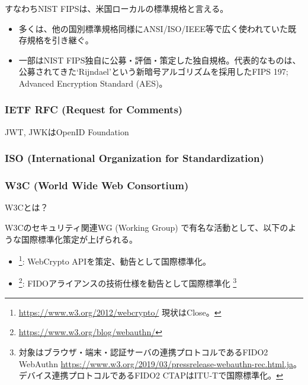 \documentclass[12pt,dvipdfmx]{beamer}
\begin{document}
\begin{frame}
すなわちNIST FIPSは、米国ローカルの標準規格と言える。

\begin{itemize}
\item 多くは、他の国別標準規格同様にANSI/ISO/IEEE等で広く使われていた既存規格を引き継ぐ。
\item 一部はNIST FIPS独自に公募・評価・策定した独自規格。代表的なものは、公募されてきた`Rijndael'という新暗号アルゴリズムを採用したFIPS 197; Advanced Encryption Standard (AES)。
\end{itemize}
\end{frame}

\begin{frame}
\frametitle{IETF RFC (Request for Comments)}
JWT, JWKはOpenID Foundation
\end{frame}

\begin{frame}
\frametitle{ISO (International Organization for Standardization)}
\end{frame}

\begin{frame}
\frametitle{W3C (World Wide Web Consortium)}
\begin{block}{W3Cとは？}
\end{block}

\end{frame}

\begin{frame}
W3Cのセキュリティ関連WG (Working Group) で有名な活動として、以下のような国際標準化策定が上げられる。
\begin{itemize}
 \item {}\footnote[frame]{\scriptsize \url{https://www.w3.org/2012/webcrypto/} 現状はClose。}: WebCrypto APIを策定、勧告として国際標準化。
 \item {}\footnote[frame]{\scriptsize \url{https://www.w3.org/blog/webauthn/}}: FIDOアライアンスの技術仕様を勧告として国際標準化 \footnote[frame]{\scriptsize 対象はブラウザ・端末・認証サーバの連携プロトコルであるFIDO2 WebAuthn \url{https://www.w3.org/2019/03/pressrelease-webauthn-rec.html.ja}。デバイス連携プロトコルであるFIDO2 CTAPはITU-Tで国際標準化。}
\end{itemize} 
\end{frame}
\end{document}
